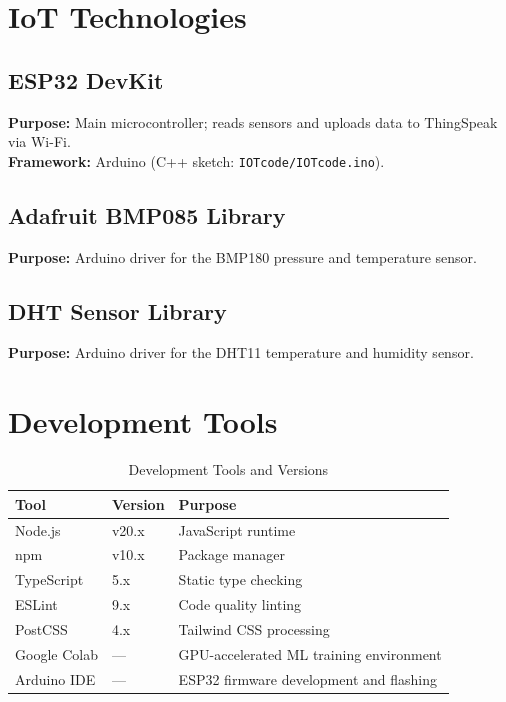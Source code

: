 \section{IoT Technologies}

\subsection{ESP32 DevKit}
\textbf{Purpose:} Main microcontroller; reads sensors and uploads data to ThingSpeak via Wi-Fi.\\
\textbf{Framework:} Arduino (C++ sketch: \texttt{IOTcode/\allowbreak{}IOTcode.\allowbreak{}ino}).

\subsection{Adafruit BMP085 Library}
\textbf{Purpose:} Arduino driver for the BMP180 pressure and temperature sensor.

\subsection{DHT Sensor Library}
\textbf{Purpose:} Arduino driver for the DHT11 temperature and humidity sensor.

\section{Development Tools}

\begin{table}[H]
\centering
\caption{Development Tools and Versions}
\begin{tabularx}{\linewidth}{|l|l|X|}
\hline
\rowcolor{FloodLight}
\textbf{Tool} & \textbf{Version} & \textbf{Purpose} \\
\hline
Node.js & v20.x & JavaScript runtime \\
npm & v10.x & Package manager \\
TypeScript & 5.x & Static type checking \\
ESLint & 9.x & Code quality linting \\
PostCSS & 4.x & Tailwind CSS processing \\
Google Colab & --- & GPU-accelerated ML training environment \\
Arduino IDE & --- & ESP32 firmware development and flashing \\
\hline
\end{tabularx}
\end{table}

